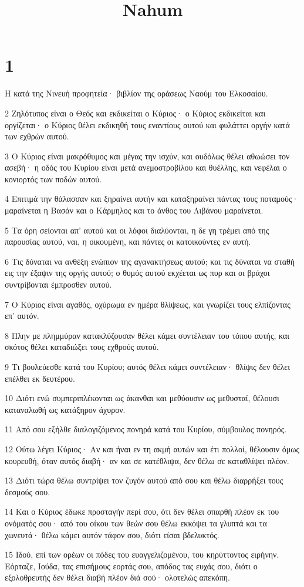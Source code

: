 

\title{Nahum}


\chapter{1}

\par Η κατά της Νινευή προφητεία· βιβλίον της οράσεως Ναούμ του Ελκοσαίου.
\par 2 Ζηλότυπος είναι ο Θεός και εκδικείται ο Κύριος· ο Κύριος εκδικείται και οργίζεται· ο Κύριος θέλει εκδικηθή τους εναντίους αυτού και φυλάττει οργήν κατά των εχθρών αυτού.
\par 3 Ο Κύριος είναι μακρόθυμος και μέγας την ισχύν, και ουδόλως θέλει αθωώσει τον ασεβή· η οδός του Κυρίου είναι μετά ανεμοστροβίλου και θυέλλης, και νεφέλαι ο κονιορτός των ποδών αυτού.
\par 4 Επιτιμά την θάλασσαν και ξηραίνει αυτήν και καταξηραίνει πάντας τους ποταμούς· μαραίνεται η Βασάν και ο Κάρμηλος και το άνθος του Λιβάνου μαραίνεται.
\par 5 Τα όρη σείονται απ' αυτού και οι λόφοι διαλύονται, η δε γη τρέμει από της παρουσίας αυτού, ναι, η οικουμένη, και πάντες οι κατοικούντες εν αυτή.
\par 6 Τις δύναται να ανθέξη ενώπιον της αγανακτήσεως αυτού; και τις δύναται να σταθή εις την έξαψιν της οργής αυτού; ο θυμός αυτού εκχέεται ως πυρ και οι βράχοι συντρίβονται έμπροσθεν αυτού.
\par 7 Ο Κύριος είναι αγαθός, οχύρωμα εν ημέρα θλίψεως, και γνωρίζει τους ελπίζοντας επ' αυτόν.
\par 8 Πλην με πλημμύραν κατακλύζουσαν θέλει κάμει συντέλειαν του τόπου αυτής, και σκότος θέλει καταδιώξει τους εχθρούς αυτού.
\par 9 Τι βουλεύεσθε κατά του Κυρίου; αυτός θέλει κάμει συντέλειαν· θλίψις δεν θέλει επέλθει εκ δευτέρου.
\par 10 Διότι ενώ συμπεριπλέκονται ως άκανθαι και μεθύουσιν ως μεθυσταί, θέλουσι καταναλωθή ως κατάξηρον άχυρον.
\par 11 Από σου εξήλθε διαλογιζόμενος πονηρά κατά του Κυρίου, σύμβουλος πονηρός.
\par 12 Ούτω λέγει Κύριος· Αν και ήναι εν τη ακμή αυτών και έτι πολλοί, θέλουσιν όμως κουρευθή, όταν αυτός διαβή· αν και σε κατέθλιψα, δεν θέλω σε καταθλίψει πλέον.
\par 13 Διότι τώρα θέλω συντρίψει τον ζυγόν αυτού από σου και θέλω διαρρήξει τους δεσμούς σου.
\par 14 Και ο Κύριος έδωκε προσταγήν περί σου, ότι δεν θέλει σπαρθή πλέον εκ του ονόματός σου· από του οίκου των θεών σου θέλω εκκόψει τα γλυπτά και τα χωνευτά· θέλω κάμει αυτόν τάφον σου, διότι είσαι βδελυκτός.
\par 15 Ιδού, επί των ορέων οι πόδες του ευαγγελιζομένου, του κηρύττοντος ειρήνην. Εόρταζε, Ιούδα, τας επισήμους εορτάς σου, απόδος τας ευχάς σου, διότι ο εξολοθρευτής δεν θέλει διαβή πλέον διά σού· ολοτελώς απεκόπη.

